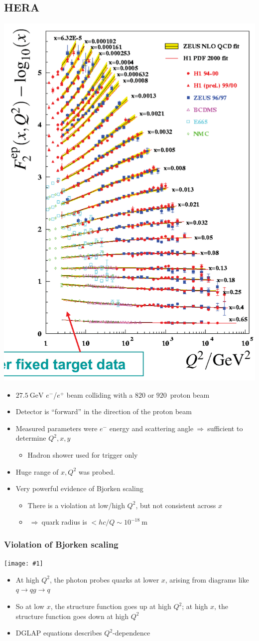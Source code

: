 \documentclass[11pt]{article}
\newcommand{\gev}{\text{GeV}}
\newcommand{\m}{\text{m}}
\newcommand{\el}{\ensuremath{e^{-}}\xspace}
\newcommand{\pos}{\ensuremath{e^{+}}\xspace}
\newcommand{\thus}{\ensuremath{~\Rightarrow~}}
\newcommand{\embedimgw}[2]{\begin{center}\texttt{[image: \#1]}\end{center}}
\begin{document}
\subsection{HERA}
  \begin{center}  \includegraphics[height=0.7\textwidth,angle=90]{figs/hera.png} \end{center}
\begin{itemize}
  \item $27.5~\gev$ \el/\pos beam colliding with a $820$ or $920$~\gev proton beam
  \item Detector is ``forward'' in the direction of the proton beam
  \item Measured parameters were \el energy and scattering angle\thus sufficient to determine $Q^2,x,y$
  \begin{itemize}
    \item Hadron shower used for trigger only
  \end{itemize}
  \item Huge range of $x,Q^2$ was probed. 
  \item Very powerful evidence of Bjorken scaling 
  \begin{itemize}
    \item There is a violation at low/high $Q^2$, but not consistent across $x$ 
    \item \thus quark radius is $< hc/Q \sim 10^{-18}~\m$
  \end{itemize}
\end{itemize}

\subsubsection{Violation of Bjorken scaling}
\embedimgw{figs/scaleviol.png}{.7}
\begin{itemize}
  \item At high $Q^2$, the photon probes quarks at lower $x$, arising from diagrams like $q\rightarrow qg\rightarrow q$
  \item So at low $x$, the structure function goes up at high $Q^2$; at high $x$, the structure function goes down at high $Q^2$
  \item DGLAP equations describes $Q^2$-dependence
\end{itemize}
\end{document}
